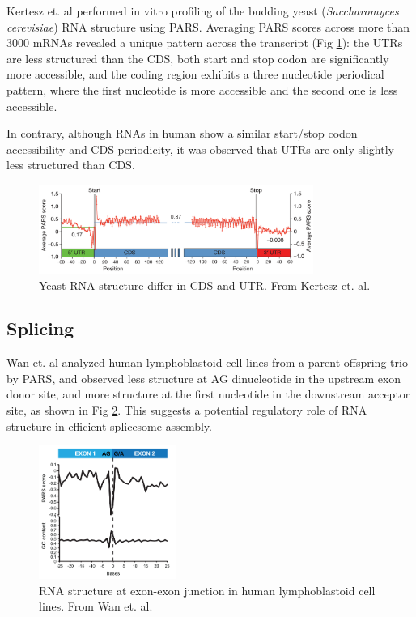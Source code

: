 \documentclass{proposal}
\begin{document}
Kertesz et. al\cite{kertesz2010genome} performed in vitro profiling of ﻿the budding yeast
(\textit{Saccharomyces cerevisiae}) RNA structure using PARS.
Averaging PARS scores across more than $3000$ mRNAs revealed a unique pattern across the transcript (Fig \ref{fig:yeast_cds_utr}):
 the UTRs are less structured than the CDS, both start and stop codon are significantly more accessible,
and the coding region exhibits a three nucleotide periodical pattern,
where the first nucleotide is more accessible and the second one is less accessible.

In contrary, although RNAs in human show a similar start/stop codon accessibility and CDS periodicity,
it was observed that UTRs are only slightly less structured than CDS\cite{wan2014landscape}.


\begin{figure}[h!]
    \centering
    \includegraphics[width=0.8\textwidth]{yeast_cds_utr.png}
    \caption{Yeast RNA structure differ in CDS and UTR. From Kertesz et. al\cite{kertesz2010genome}.}
    \label{fig:yeast_cds_utr}
    \centering
\end{figure}



\subsection*{Splicing}

Wan et. al\cite{wan2014landscape} analyzed human lymphoblastoid cell lines from a parent-offspring trio by PARS,
and observed less structure at AG dinucleotide in the upstream exon donor site,
and more structure at the first nucleotide in the downstream acceptor site, as shown in Fig \ref{fig:exon_exon_junction}.
This suggests a potential regulatory role of RNA structure in efficient splicesome assembly.


\begin{figure}[h!]
    \centering
    \includegraphics[width=0.4\textwidth]{exon_exon_junction.png}
    \caption{RNA structure at exon-exon junction in human lymphoblastoid cell lines. From Wan et. al\cite{wan2014landscape}.}
    \label{fig:exon_exon_junction}
    \centering
\end{figure}
\end{document}
